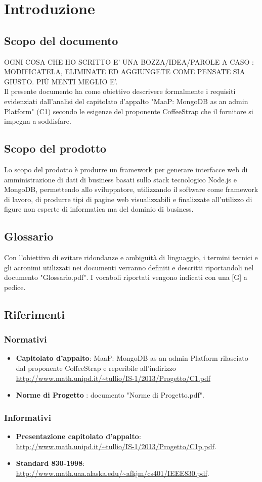 \section{Introduzione}


\subsection{Scopo del documento}
OGNI COSA CHE HO SCRITTO E' UNA BOZZA/IDEA/PAROLE A CASO : MODIFICATELA, ELIMINATE ED AGGIUNGETE COME PENSATE SIA GIUSTO.
PIÙ MENTI MEGLIO E'. \\ 
Il presente documento ha come obiettivo descrivere formalmente i requisiti evidenziati dall'analisi del capitolato d'appalto "MaaP: MongoDB as an admin Platform" (C1) secondo le esigenze del proponente CoffeeStrap che il fornitore \GroupName si impegna a soddisfare.


\subsection{Scopo del prodotto}
Lo scopo del prodotto è produrre un framework per generare interfacce web di amministrazione di dati di business basati sullo stack tecnologico Node.js e MongoDB, permettendo allo sviluppatore, utilizzando il software come framework di lavoro, di produrre tipi di pagine web visualizzabili e finalizzate all'utilizzo di figure non esperte di informatica ma del dominio di business.

\subsection{Glossario}
Con l'obiettivo di evitare ridondanze e ambiguità di linguaggio, i termini tecnici e gli acronimi utilizzati nei documenti verranno definiti e descritti riportandoli nel documento "Glossario.pdf". I vocaboli riportati vengono indicati con una [G] a pedice.

\subsection{Riferimenti}
	\subsubsection{Normativi}
	\begin{itemize}
	\item \textbf{Capitolato d'appalto}: MaaP: MongoDB as an admin Platform rilasciato dal proponente
	CoffeeStrap e reperibile all'indirizzo 
	\url{http://www.math.unipd.it/~tullio/IS-1/2013/Progetto/C1.pdf}
	 
		\item \textbf{Norme di Progetto} : documento "Norme di Progetto.pdf". 
	\end{itemize}
	
	
	\subsubsection{Informativi}
		\begin{itemize}
			\item \textbf{Presentazione capitolato d'appalto}: \url{http://www.math.unipd.it/~tullio/IS-1/2013/Progetto/C1p.pdf}.
			\item \textbf{Standard 830-1998}: \url{http://www.math.uaa.alaska.edu/~afkjm/cs401/IEEE830.pdf}. 
		\end{itemize}
		
